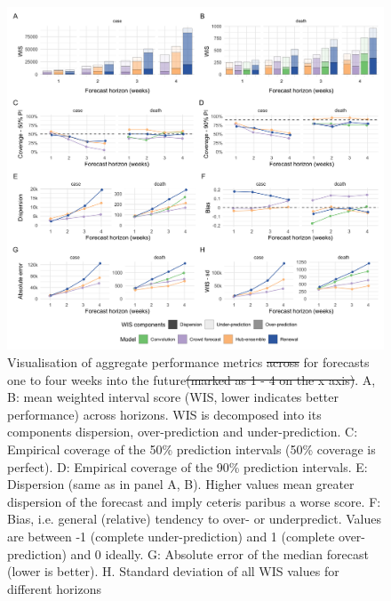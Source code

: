 \documentclass[10pt,letterpaper]{article} %
\providecommand{\DIFdeltex}[1]{{\protect\color{red}\sout{#1}}}                      %
\providecommand{\DIFdelFL}[1]{\DIFdel{#1}} %
\providecommand{\DIFdelbeginFL}{} %
\providecommand{\DIFdelendFL}{} %
\providecommand{\DIFdel}[1]{\texorpdfstring{\DIFdeltex{#1}}{}} %
\newcommand{\DIFscaledelfig}{0.5}
\newlength{\DIFdelgraphicswidth} %
\newlength{\DIFdelgraphicsheight} %
\newcommand{\DIFdelincludegraphics}[2][]{%
\sbox{\DIFdelgraphicsbox}{\DIFOincludegraphics[#1]{#2}}%
\settoboxwidth{\DIFdelgraphicswidth}{\DIFdelgraphicsbox} %
\settoboxtotalheight{\DIFdelgraphicsheight}{\DIFdelgraphicsbox} %
\scalebox{\DIFscaledelfig}{%
\parbox[b]{\DIFdelgraphicswidth}{\usebox{\DIFdelgraphicsbox}\\[-\baselineskip] \rule{\DIFdelgraphicswidth}{0em}}\llap{\resizebox{\DIFdelgraphicswidth}{\DIFdelgraphicsheight}{%
\setlength{\unitlength}{\DIFdelgraphicswidth}%
\begin{picture}(1,1)%
\thicklines\linethickness{2pt} %
{\color[rgb]{1,0,0}\put(0,0){\framebox(1,1){}}}%
{\color[rgb]{1,0,0}\put(0,0){\line( 1,1){1}}}%
{\color[rgb]{1,0,0}\put(0,1){\line(1,-1){1}}}%
\end{picture}%
}\hspace*{3pt}}} %
} %
\DeclareRobustCommand{\DIFdelbeginFL}{\DIFOdelbeginFL \let\includegraphics\DIFdelincludegraphics} %
\DeclareRobustCommand{\DIFdelendFL}{\DIFOaddendFL \let\includegraphics\DIFOincludegraphics} %
\begin{document}
\begin{figure}[H]
\includegraphics[width=1\linewidth,]{../analysis/plots/aggregate-performance-all-v4} \caption{Visualisation of aggregate performance metrics \DIFdelbeginFL \DIFdelFL{across }\DIFdelendFL for forecasts one to four weeks into the future\DIFdelbeginFL \DIFdelFL{(marked as 1 - 4 on the x axis)}\DIFdelendFL . A, B: mean weighted interval score (WIS, lower indicates better performance) across horizons. WIS is decomposed into its components dispersion, over-prediction and under-prediction. C: Empirical coverage of the 50\% prediction intervals (50\% coverage is perfect). D: Empirical coverage of the 90\% prediction intervals. E: Dispersion (same as in panel A, B). Higher values mean greater dispersion of the forecast and imply ceteris paribus a worse score. F: Bias, i.e. general (relative) tendency to over- or underpredict. Values are between -1 (complete under-prediction) and 1 (complete over-prediction) and 0 ideally. G: Absolute error of the median forecast (lower is better). H. Standard deviation of all WIS values for different horizons}\label{fig:agg-performance-all}
\end{figure}
\end{document}

